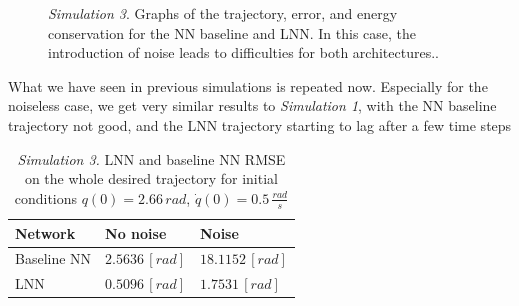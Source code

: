 \documentclass[a4paper]{article}
\begin{document}
\begin{figure}
    \centering
    \qquad
    \caption{\textit{Simulation 3}. Graphs of the trajectory, error, and energy conservation for the NN baseline and LNN. In this case, the introduction of noise leads to difficulties for both architectures..}
    \label{fig:rigid_150degrees_05rads}
\end{figure}

What we have seen in previous simulations is repeated now. Especially for the noiseless case, we get very similar results to \textit{Simulation 1}, with the NN baseline trajectory not good, and the LNN trajectory starting to lag after a few time steps

\begin{table}
    \centering
    \caption{\textit{Simulation 3.} LNN and baseline NN RMSE on the whole desired trajectory for initial conditions $q(0)=2.66\, rad$, $\dot{q}(0)=0.5\, \frac{rad}{s}$}
    \begin{tabular}{P{2.5cm}P{2.5cm}P{2.5cm}} 
    \hline\hline
    \textbf{Network} & \textbf{No noise} & \textbf{Noise} \\ 
    \hline
     Baseline NN & $2.5636\, [rad]$ & $18.1152\, [rad]$\\
    \hline
     LNN & $0.5096\, [rad]$& $1.7531\, [rad]$\\
    \hline\hline
    \end{tabular}
    \label{tab:rigid_rmse_3}    
\end{table}
\end{document}
